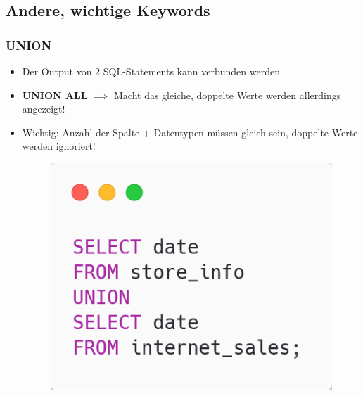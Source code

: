 \subsection{Andere, wichtige Keywords}
\subsubsection{UNION}
\begin{itemize}
    \item Der Output von 2 SQL-Statements kann verbunden werden
    \item \textbf{UNION ALL} $\implies$ Macht das gleiche, doppelte Werte werden allerdings angezeigt!
    \item Wichtig: Anzahl der Spalte + Datentypen müssen gleich sein, doppelte Werte werden ignoriert!
    \begin{figure}[H]
        \centering
        \includegraphics[scale=.4]{res/themekorb_2/union.png} 
    \end{figure}
\end{itemize}

